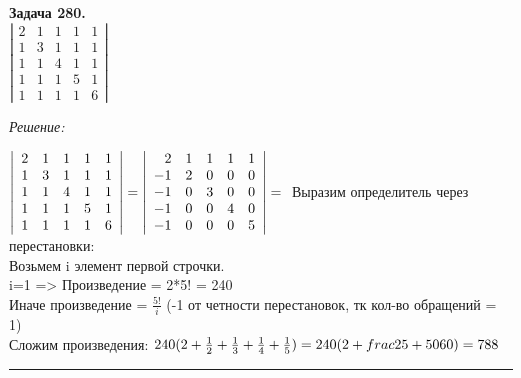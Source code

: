\documentclass[a4paper, 12pt]{article}
\newenvironment{problem}[2][Задача]
    { \begin{mdframed}[backgroundcolor=gray!10] \textbf{#1 #2.} \\}
    {  \end{mdframed}}
\newenvironment{solution}
    {\textit{Решение: }}
    {\noindent\rule{7in}{1.5pt}}
\begin{document}
\begin{problem}{280}
$\left| \begin{array}{rrrrr}2 & 1 & 1 & 1 & 1 \\ 1 & 3 & 1 & 1 & 1 \\ 1 & 1 & 4 & 1 & 1 \\ 1 & 1 & 1 & 5 & 1 \\ 1 & 1 & 1 & 1 & 6 \end{array} \right|$
\end{problem}
\begin{solution}

$
\left|
\begin{array}{rrrrr}
2 & 1 & 1 & 1 & 1 \\
1 & 3 & 1 & 1 & 1 \\
1 & 1 & 4 & 1 & 1 \\
1 & 1 & 1 & 5 & 1 \\
1 & 1 & 1 & 1 & 6
\end{array}
\right|
=
\left|
\begin{array}{rrrrr}
2 & 1 & 1 & 1 & 1 \\
-1 & 2 & 0 & 0 & 0 \\
-1 & 0 & 3 & 0 & 0 \\
-1 & 0 & 0 & 4 & 0 \\
-1 & 0 & 0 & 0 & 5
\end{array}
\right|
= \\
$
Выразим определитель через перестановки: \\
Возьмем i элемент первой строчки. \\
i=1 => Произведение = 2*5! = 240 \\
Иначе произведение = $\frac{5!}{i}$ (-1 от четности перестановок, тк кол-во обращений = 1) \\
Сложим произведения:
$
240(2 + \frac{1}{2} + \frac{1}{3} + \frac{1}{4} + \frac{1}{5}) =
240(2 + frac{25 + 50}{60}) = 788\\
$ \\

\end{solution}
\end{document}
